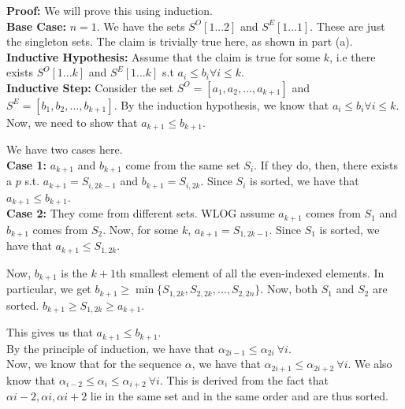 \documentclass[a4paper]{article}
\begin{document}
\begin{enumerate}
\begin{enumerate}
    \textbf{Proof:} We will prove this using induction.\\

    \textbf{Base Case:} $n = 1$. We have the sets $S^O[1...2]$ and $S^E[1...1]$. These are just the singleton sets. The claim is trivially true here, as shown in part (a).\\

    \textbf{Inductive Hypothesis:} Assume that the claim is true for some $k$, i.e there exists $S^O[1...k]$ and $S^E[1...k]$ s.t $a_i \leq b_i \forall i \leq k$.\\

    \textbf{Inductive Step:} Consider the set $S^O = [a_1, a_2, \dots, a_{k+1}]$ and $S^E = [b_1, b_2, \dots, b_{k+1}]$. By the induction hypothesis, we know that $a_i \leq b_i \forall i \leq k$. Now, we need to show that $a_{k+1} \leq b_{k+1}$.
    
    We have two cases here.\\

    \textbf{Case 1:} $a_{k+1}$ and $b_{k+1}$ come from the same set $S_i$. If they do, then, there exists a $p$ s.t. $a_{k+1} = S_{i,{2k - 1}}$ and $b_{k+1} = S_{i,{2k}}$.  Since $S_i$ is sorted, we have that $a_{k+1} \leq b_{k+1}$.\\

    \textbf{Case 2:} They come from different sets. WLOG assume $a_{k+1}$ comes from $S_1$ and $b_{k+1}$ comes from $S_2$. Now, for some $k$, $a_{k+1} = S_{1,{2k - 1}}$. Since $S_1$ is sorted, we have that $a_{k+1} \leq S_{1,{2k}}$.

    Now, $b_{k+1}$ is the $k+1$th smallest element of all the even-indexed elements. In particular, we get $b_{k+1} \geq \min \{S_{1,2k}, S_{2,2k}, \dots, S_{2,2n}\}$. Now, both $S_{1}$ and $S_{2}$ are sorted. $b_{k+1} \geq S_{1,2k} \geq a_{k+1}$.

    This gives us that $a_{k+1} \leq b_{k+1}$.\\

    By the principle of induction, we have that $\alpha_{2i - 1} \leq \alpha_{2i}\ \forall i$.\\

    Now, we know that for the sequence $\alpha$, we have that $\alpha_{2i + 1} \leq \alpha_{2i + 2}\ \forall i$. We also know that $\alpha_{i - 2} \leq \alpha_{i} \leq \alpha_{i + 2}\ \forall i$. This is derived from the fact that $\alpha{i-2}, \alpha{i}, \alpha{i+2}$ lie in the same set and in the same order and are thus sorted.\\


\end{enumerate}
\end{enumerate}
\end{document}

